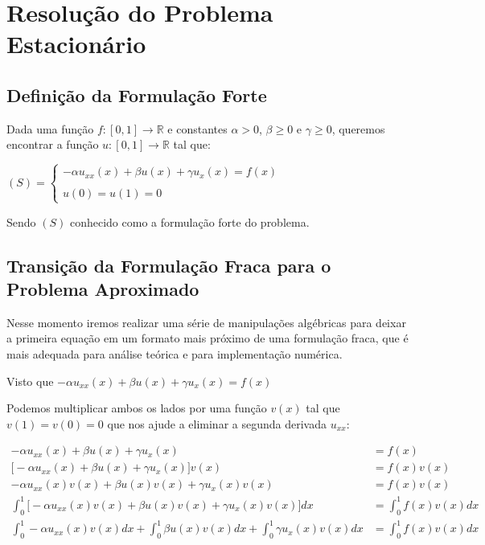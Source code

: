 
\chapter{Resolução do Problema Estacionário}
\section{Definição da Formulação Forte}

  Dada uma função $f : [0,1] \to \mathbb{R}$ e constantes $\alpha > 0$, $\beta \geq 0$ e $\gamma \geq 0$, queremos encontrar a função $u : [0,1] \to \mathbb{R}$ tal que:

  \begin{center}
    $(S) = \begin{cases}
      -\alpha u_{xx}(x) + \beta u(x) + \gamma u_{x}(x) = f(x) \\
      \\
      u(0) = u(1) = 0
    \end{cases}$
  \end{center}

  Sendo $(S)$ conhecido como a formulação forte do problema.

\section{Transição da Formulação Fraca para o Problema Aproximado}

  Nesse momento iremos realizar uma série de manipulações algébricas para deixar a primeira equação em um formato mais próximo de uma formulação fraca, que é mais adequada para análise teórica e para implementação numérica.

Visto que $-\alpha u_{xx}(x) + \beta u(x) + \gamma u_{x}(x) = f(x)$

Podemos multiplicar ambos os lados por uma função $v(x)$ tal que $v(1) = v(0) = 0$ que nos ajude a eliminar a segunda derivada $u_{xx}$:

\begin{align*}
  -\alpha u_{xx}(x) + \beta u(x) + \gamma u_{x}(x) &= f(x) \\
  \Big[-\alpha u_{xx}(x) + \beta u(x) + \gamma u_{x}(x)\Big]v(x) &= f(x)v(x)\\
  -\alpha u_{xx}(x)v(x) + \beta u(x)v(x) + \gamma u_{x}(x)v(x) &= f(x)v(x)\\
  \int^{1}_{0} \Big[-\alpha u_{xx}(x)v(x) + \beta u(x)v(x) + \gamma u_{x}(x)v(x)\Big] dx &= \int^{1}_{0} f(x)v(x) dx\\
  \int^{1}_{0} -\alpha u_{xx}(x)v(x) dx + \int^{1}_{0} \beta u(x)v(x) dx + \int^{1}_{0} \gamma u_{x}(x)v(x) dx &= \int^{1}_{0} f(x)v(x) dx
\end{align*}


